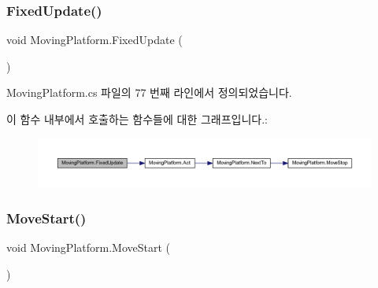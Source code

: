 \subsubsection{\texorpdfstring{FixedUpdate()}{FixedUpdate()}}
{\footnotesize\ttfamily void Moving\+Platform.\+Fixed\+Update (\begin{DoxyParamCaption}{ }\end{DoxyParamCaption})\hspace{0.3cm}{\ttfamily [private]}}



Moving\+Platform.\+cs 파일의 77 번째 라인에서 정의되었습니다.


\begin{DoxyCode}{0}

\end{DoxyCode}
이 함수 내부에서 호출하는 함수들에 대한 그래프입니다.\+:\nopagebreak
\begin{figure}[H]
\begin{center}
\leavevmode
\includegraphics[width=350pt]{df/d42/class_moving_platform_a935710333a3a0f0164dad887e8eb7d1c_cgraph}
\end{center}
\end{figure}
\mbox{\label{class_moving_platform_a2e7148eddf9ada2373e3507c02146896}} 
\subsubsection{\texorpdfstring{MoveStart()}{MoveStart()}}
{\footnotesize\ttfamily void Moving\+Platform.\+Move\+Start (\begin{DoxyParamCaption}{ }\end{DoxyParamCaption})}



